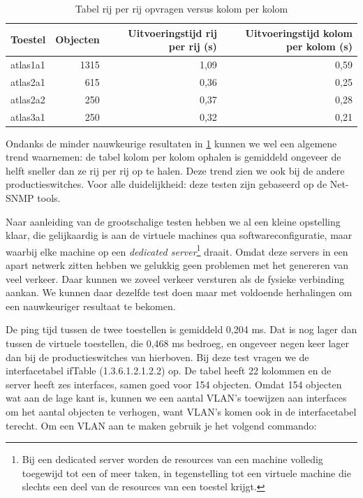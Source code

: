 
\begin{table}[h]
\centering
\begin{tabular}{@{}lrrr@{}}
\toprule
Toestel  & Objecten & Uitvoeringstijd rij per rij (s) & Uitvoeringstijd kolom per kolom (s) \\ \midrule
atlas1a1 & 1315     & 1,09                            & 0,59                                \\
atlas2a1 & 615      & 0,36                            & 0,25                                \\
atlas2a2 & 250      & 0,37                            & 0,28                                \\
atlas3a1 & 250      & 0,32                            & 0,21                                \\ \bottomrule
\end{tabular}
\caption{Tabel rij per rij opvragen versus kolom per kolom}
\label{tabel-serieel-vs-parallel}
\end{table}

Ondanks de minder nauwkeurige resultaten in \cref{tabel-serieel-vs-parallel} kunnen we wel een algemene trend waarnemen:
de tabel kolom per kolom ophalen is gemiddeld ongeveer de helft sneller dan ze rij per rij op te halen.
Deze trend zien we ook bij de andere productieswitches.
Voor alle duidelijkheid: deze testen zijn gebaseerd op de Net-SNMP tools.

Naar aanleiding van de grootschalige testen hebben we al een kleine opstelling klaar, die gelijkaardig is aan de virtuele machines qua softwareconfiguratie,
maar waarbij elke machine op een \textit{dedicated server}\footnote{
	Bij een dedicated server worden de resources van een machine volledig toegewijd tot een of meer taken,
	in tegenstelling tot een virtuele machine die slechts een deel van de resources van een toestel krijgt.
} draait.
Omdat deze servers in een apart netwerk zitten hebben we gelukkig geen problemen met het genereren van veel verkeer.
Daar kunnen we zoveel verkeer versturen als de fysieke verbinding aankan.
We kunnen daar dezelfde test doen maar met voldoende herhalingen om een nauwkeuriger resultaat te bekomen.

De ping tijd tussen de twee toestellen is gemiddeld 0,204 ms.
Dat is nog lager dan tussen de virtuele toestellen, die 0,468 ms bedroeg, en ongeveer negen keer lager dan bij de productieswitches van hierboven.
Bij deze test vragen we de interfacetabel ifTable (1.3.6.1.2.1.2.2) op.
De tabel heeft 22 kolommen en de server heeft zes interfaces, samen goed voor 154 objecten.
Omdat 154 objecten wat aan de lage kant is,
kunnen we een aantal VLAN's toewijzen aan interfaces om het aantal objecten te verhogen,
want VLAN's komen ook in de interfacetabel terecht.
Om een VLAN aan te maken gebruik je het volgend commando:

